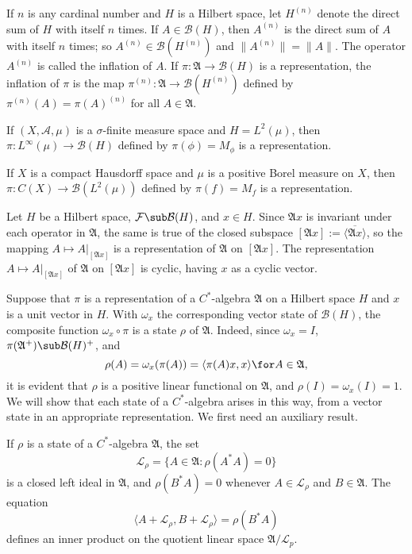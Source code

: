 \begin{example}
If $n$ is any cardinal number and $H$ is a Hilbert space, let $H^{(n)}$ denote the direct sum of $H$ with itself $n$ times. If $A\in\mathcal{B}(H)$, then $A^{(n)}$ is the direct sum of $A$ with itself $n$ times; so $A^{(n)}\in\mathcal{B}(H^{(n)})$ and $\|A^{(n)}\|=\|A\|$. The operator $A^{(n)}$ is called the inflation of $A$. If $\pi:\mathfrak{A}\to\mathcal{B}(H)$ is a representation, the inflation of $\pi$ is the map $\pi^{(n)}:\mathfrak{A}\to\mathcal{B}(H^{(n)})$ defined by $\pi^{(n)}(A)=\pi(A)^{(n)}$ for all $A\in\mathfrak{A}$.
\end{example}
\begin{example}
If $(X,\mathcal{A},\mu)$ is a $\sigma$-finite measure space and $H=L^2(\mu)$, then $\pi:L^\infty(\mu)\to\mathcal{B}(H)$ defined by $\pi(\phi)=M_\phi$ is a representation.
\end{example}
\begin{example}
If $X$ is a compact Hausdorff space and $\mu$ is a positive Borel measure on $X$, then $\pi:C(X)\to\mathcal{B}(L^2(\mu))$ defined by $\pi(f)=M_f$ is a representation.
\end{example}
\begin{example}
Let $H$ be a Hilbert space, $\mathcal{F}\sub\mathcal{B}(H)$, and $x\in H$. Since $\mathfrak{A}x$ is invariant under each operator in $\mathfrak{A}$, the same is true of the closed subspace $[\mathfrak{A}x]:=\overline{\langle\mathfrak{A}x\rangle}$, so the mapping $A\mapsto A|_{[\mathfrak{A}x]}$ is a representation of $\mathfrak{A}$ on $[\mathfrak{A}x]$. The representation $A\mapsto A|_{[\mathfrak{A}x]}$ of $\mathfrak{A}$ on $[\mathfrak{A}x]$ is cyclic, having $x$ as a cyclic vector.
\end{example}
Suppose that $\pi$ is a representation of a $C^*$-algebra $\mathfrak{A}$ on a Hilbert space $H$ and $x$ is a unit vector in $H$. With $\omega_x$ the corresponding vector state of $\mathcal{B}(H)$, the composite function $\omega_x\circ\pi$ is a state $\rho$ of $\mathfrak{A}$. Indeed, since $\omega_x=I$, $\pi(\mathfrak{A}^+)\sub\mathcal{B}(H)^+$, and
\[\rho(A)=\omega_x(\pi(A))=\langle\pi(A)x,x\rangle\for A\in\mathfrak{A},\]
it is evident that $\rho$ is a positive linear functional on $\mathfrak{A}$, and $\rho(I)=\omega_x(I)=1$. We will show that each state of a $C^*$-algebra arises in this way, from a vector state in an appropriate representation. We first need an auxiliary result.
\begin{proposition}\label{C^* algebra state left kernel}
If $\rho$ is a state of a $C^*$-algebra $\mathfrak{A}$, the set
\[\mathscr{L}_\rho=\{A\in\mathfrak{A}:\rho(A^*A)=0\}\]
is a closed left ideal in $\mathfrak{A}$, and $\rho(B^*A)=0$ whenever $A\in\mathscr{L}_\rho$ and $B\in\mathfrak{A}$. The equation
\[\langle A+\mathscr{L}_\rho,B+\mathscr{L}_\rho\rangle=\rho(B^*A)\]
defines an inner product on the quotient linear space $\mathfrak{A}/\mathscr{L}_p$.
\end{proposition}
